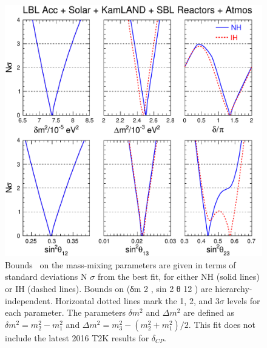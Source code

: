 \begin{figure}[htbp]
   	      \includegraphics[width=0.8\linewidth]{figures/Fig_01_lisi.pdf}
    \caption{Bounds~\cite{fogli} on the mass-mixing parameters are given in terms of
standard deviations N $\sigma$ from the best fit, for either NH (solid lines) or IH (dashed lines). Bounds on (δm 2 , sin 2 θ 12 ) are
hierarchy-independent. Horizontal dotted lines mark the 1, 2, and 3$\sigma$ levels for each parameter. The parameters $\delta m^2$ and $\Delta m^2$ are defined as 
$\delta m^2 = m^2_2 - m^2_1$ and $\Delta m^2 = m^2_3 - (m^2_2 + m^2_1)/2$.
This fit does not include the latest 2016 T2K results for $\delta_{CP}$.
}
 \label{fig:globalfit}
\end{figure}


